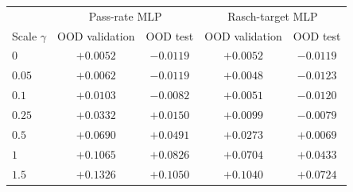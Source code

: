 \begin{tabular}{lcccc}
\toprule
 & \multicolumn{2}{c}{Pass-rate MLP} & \multicolumn{2}{c}{Rasch-target MLP} \\
Scale $\gamma$ & OOD validation & OOD test & OOD validation & OOD test \\
\midrule
$0$ & $\mathbf{+0.0052}$ & $\minus0.0119$ & $+0.0052$ & $\minus0.0119$ \\
\midrule
$0.05$ & $+0.0062$ & $\mathbf{\minus0.0119}$ & $\mathbf{+0.0048}$ & $\mathbf{\minus0.0123}$ \\
$0.1$ & $+0.0103$ & $\minus0.0082$ & $+0.0051$ & $\minus0.0120$ \\
$0.25$ & $+0.0332$ & $+0.0150$ & $+0.0099$ & $\minus0.0079$ \\
$0.5$ & $+0.0690$ & $+0.0491$ & $+0.0273$ & $+0.0069$ \\
$1$ & $+0.1065$ & $+0.0826$ & $+0.0704$ & $+0.0433$ \\
$1.5$ & $+0.1326$ & $+0.1050$ & $+0.1040$ & $+0.0724$ \\
\bottomrule
\end{tabular}
